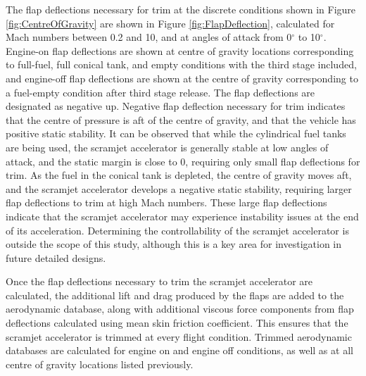 		The flap deflections necessary for trim at the discrete conditions shown in Figure \ref{fig:CentreOfGravity} are shown in Figure \ref{fig:FlapDeflection}, calculated for Mach numbers between 0.2 and 10, and at angles of attack from 0$^\circ$ to 10$^\circ$. Engine-on flap deflections are shown at centre of gravity locations corresponding to full-fuel, full conical tank, and empty conditions with the third stage included, and engine-off flap deflections are shown at the centre of gravity corresponding to a fuel-empty condition after third stage release. 
		The flap deflections are designated as negative up. Negative flap deflection necessary for trim indicates that the centre of pressure is aft of the centre of gravity, and that the vehicle has positive static stability.
		It can be observed that while the cylindrical fuel tanks are being used, the scramjet accelerator is generally stable at low angles of attack, and the static margin is close to 0, requiring only small flap deflections for trim. As the fuel in the conical tank is depleted, the centre of gravity moves aft, and the scramjet accelerator develops a negative static stability, requiring larger flap deflections to trim at high Mach numbers. These large flap deflections indicate that the scramjet accelerator may experience instability issues at the end of its acceleration. Determining the controllability of the scramjet accelerator is outside the scope of this study, although this is a key area for investigation in future detailed designs. 
		
		
		  Once the flap deflections necessary to trim the scramjet accelerator are calculated, the additional lift and drag produced by the flaps are added to the aerodynamic database, along with additional viscous force components from flap deflections calculated using mean skin friction coefficient. This ensures that the scramjet accelerator is trimmed at every flight condition.
		  Trimmed aerodynamic databases are calculated for engine on and engine off conditions, as well as at all centre of gravity locations listed previously. 
		
		
		
		
		
		
		
